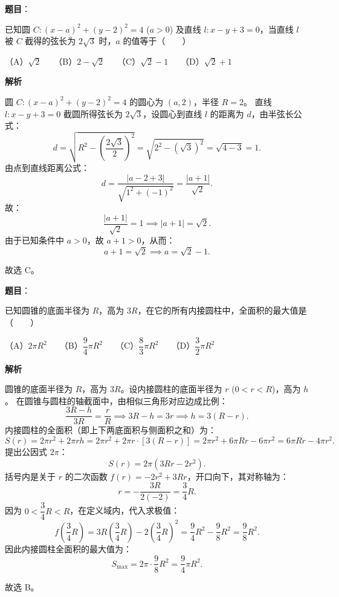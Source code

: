 \begin{answer}

\textbf{题目}：

已知圆 $C: (x - a)^2 + (y - 2)^2 = 4$ ($a > 0$) 及直线 $l: x - y + 3 = 0$，当直线 $l$ 被 $C$ 截得的弦长为 $2\sqrt{3}$ 时，$a$ 的值等于\mbox{（　　）}

（A）$\sqrt{2}$　　（B）$2 - \sqrt{2}$　　（C）$\sqrt{2} - 1$　　（D）$\sqrt{2} + 1$

\textbf{解析}

圆 $C: (x - a)^2 + (y - 2)^2 = 4$ 的圆心为 $(a, 2)$，半径 $R = 2$。
直线 $l: x - y + 3 = 0$ 截圆所得弦长为 $2\sqrt{3}$，设圆心到直线 $l$ 的距离为 $d$，由半弦长公式：
\nopagebreak[4]
\[d = \sqrt{R^2 - \left(\frac{2\sqrt{3}}{2}\right)^2} = \sqrt{2^2 - (\sqrt{3})^2} = \sqrt{4 - 3} = 1.\]
由点到直线距离公式：
\nopagebreak[4]
\[d = \frac{|a - 2 + 3|}{\sqrt{1^2 + (-1)^2}} = \frac{|a + 1|}{\sqrt{2}}.\]
故：
\nopagebreak[4]
\[\frac{|a + 1|}{\sqrt{2}} = 1 \implies |a + 1| = \sqrt{2}.\]
由于已知条件中 $a > 0$，故 $a + 1 > 0$，从而：
\nopagebreak[4]
\[a + 1 = \sqrt{2} \implies a = \sqrt{2} - 1.\]

故选 C。


\end{answer}
\begin{answer}

\textbf{题目}：

已知圆锥的底面半径为 $R$，高为 $3R$，在它的所有内接圆柱中，全面积的最大值是\mbox{（　　）}

（A）$2\pi R^2$　　（B）$\dfrac{9}{4}\pi R^2$　　（C）$\dfrac{8}{3}\pi R^2$　　（D）$\dfrac{3}{2}\pi R^2$

\textbf{解析}

圆锥的底面半径为 $R$，高为 $3R$。设内接圆柱的底面半径为 $r$ ($0 < r < R$)，高为 $h$。
在圆锥与圆柱的轴截面中，由相似三角形对应边成比例：
\nopagebreak[4]
\[\frac{3R - h}{3R} = \frac{r}{R} \implies 3R - h = 3r \implies h = 3(R - r).\]
内接圆柱的全面积（即上下两底面积与侧面积之和）为：
\nopagebreak[4]
\[S(r) = 2\pi r^2 + 2\pi rh = 2\pi r^2 + 2\pi r \cdot [3(R - r)] = 2\pi r^2 + 6\pi Rr - 6\pi r^2 = 6\pi Rr - 4\pi r^2.\]
提出公因式 $2\pi$：
\nopagebreak[4]
\[S(r) = 2\pi (3Rr - 2r^2).\]
括号内是关于 $r$ 的二次函数 $f(r) = -2r^2 + 3Rr$，开口向下，其对称轴为：
\nopagebreak[4]
\[r = -\frac{3R}{2(-2)} = \frac{3}{4}R.\]
因为 $0 < \dfrac{3}{4}R < R$，在定义域内，代入求极值：
\nopagebreak[4]
\[f\left(\frac{3}{4}R\right) = 3R \left(\frac{3}{4}R\right) - 2 \left(\frac{3}{4}R\right)^2 = \frac{9}{4}R^2 - \frac{9}{8}R^2 = \frac{9}{8}R^2.\]
因此内接圆柱全面积的最大值为：
\nopagebreak[4]
\[S_{\max} = 2\pi \cdot \frac{9}{8}R^2 = \frac{9}{4}\pi R^2.\]

故选 B。


\end{answer}

